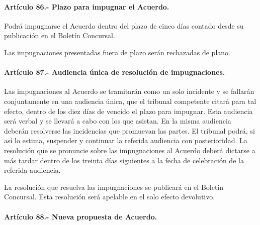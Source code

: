\documentclass[
]{book}
\begin{document}
\hypertarget{artuxedculo-86.--plazo-para-impugnar-el-acuerdo.}{%
\paragraph*{Artículo 86.- Plazo para impugnar el Acuerdo.}\label{artuxedculo-86.--plazo-para-impugnar-el-acuerdo.}}

Podrá impugnarse el Acuerdo dentro del plazo de cinco días contado desde su publicación en el Boletín Concursal.

Las impugnaciones presentadas fuera de plazo serán rechazadas de plano.

\hypertarget{artuxedculo-87.--audiencia-uxfanica-de-resoluciuxf3n-de-impugnaciones.}{%
\paragraph*{Artículo 87.- Audiencia única de resolución de impugnaciones.}\label{artuxedculo-87.--audiencia-uxfanica-de-resoluciuxf3n-de-impugnaciones.}}

Las impugnaciones al Acuerdo se tramitarán como un solo incidente y se fallarán conjuntamente en una audiencia única, que el tribunal competente citará para tal efecto, dentro de los diez días de vencido el plazo para impugnar. Esta audiencia será verbal y se llevará a cabo con los que asistan. En la misma audiencia deberán resolverse las incidencias que promuevan las partes. El tribunal podrá, si así lo estima, suspender y continuar la referida audiencia con posterioridad. La resolución que se pronuncie sobre las impugnaciones al Acuerdo deberá dictarse a más tardar dentro de los treinta días siguientes a la fecha de celebración de la referida audiencia.

La resolución que resuelva las impugnaciones se publicará en el Boletín Concursal. Esta resolución será apelable en el solo efecto devolutivo.

\hypertarget{artuxedculo-88.--nueva-propuesta-de-acuerdo.}{%
\paragraph*{Artículo 88.- Nueva propuesta de Acuerdo.}\label{artuxedculo-88.--nueva-propuesta-de-acuerdo.}}
\end{document}

